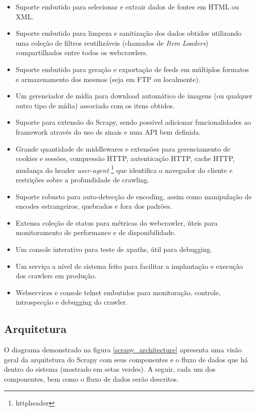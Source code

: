 \begin{itemize}
	\item Suporte embutido para selecionar e extrair dados de fontes em HTML ou XML.
	\item Suporte embutido para limpeza e sanitização dos dados obtidos utilizando uma coleção de filtros reutilizáveis (chamados de \emph{Item Loaders}) compartilhados entre todos os \glspl{webcrawler}.
	\item Suporte embutido para geração e exportação de \glspl{feed} em múltiplos formatos e armazenamento dos mesmos (seja em FTP ou localmente).
	\item Um gerenciador de mídia para download automático de imagens (ou qualquer outro tipo de mídia) associado com os itens obtidos.
	\item Suporte para extensão do Scrapy, sendo possível adicionar funcionalidades ao framework através do uso de sinais e uma API bem definida.
	\item Grande quantidade de \glspl{middleware} e extensões para gerenciamento de cookies e sessões, compressão HTTP, autenticação HTTP, cache HTTP, mudança do header \emph{user-agent} \footnote{\Gls{httpheader}} que identifica o navegador do cliente e restrições sobre a profundidade de \gls{crawling}.
	\item Suporte robusto para auto-detecção de encoding, assim como manipulação de encodes estrangeiros, quebrados e fora dos padrões.
	\item Extensa coleção de status para métricas do \gls{webcrawler}, úteis para monitoramento de performance e de disponibilidade.
	\item Um console interativo para teste de \glspl{xpath}, útil para \gls{debugging}.
	\item Um serviço a nível de sistema feito para facilitar a implantação e execução dos crawlers em produção.
	\item Webservices e console telnet embutidos para monitoração, controle, introspecção e \gls{debugging} do crawler.
\end{itemize}

\subsection{Arquitetura}

O diagrama demonstrado na figura \ref{scrapy_architecture} apresenta uma visão geral da arquitetura do Scrapy com seus componentes e o fluxo de dados que há dentro do sistema (mostrado em setas verdes). A seguir, cada um dos componentes, bem como o fluxo de dados serão descritos.

